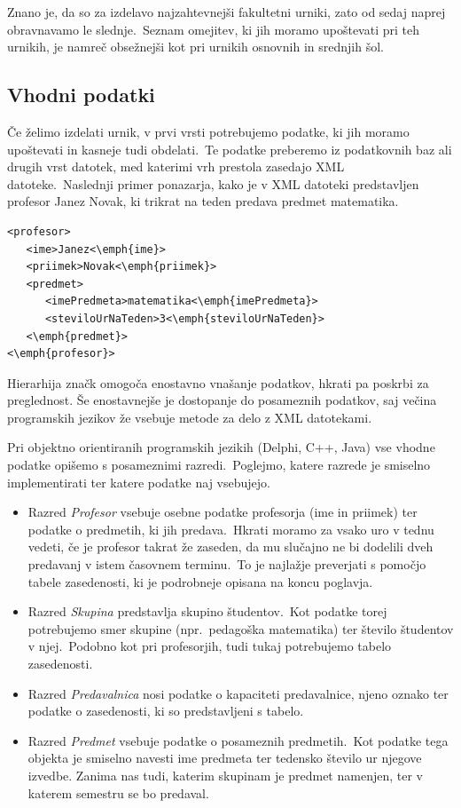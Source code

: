 \documentclass[a4paper,10pt]{article}
\begin{document}
Znano je, da so za izdelavo najzahtevnejši fakultetni urniki, zato od sedaj naprej
obravnavamo le slednje.\ Seznam omejitev, ki jih moramo upoštevati pri teh urnikih,
je namreč obsežnejši kot pri urnikih osnovnih in srednjih šol.

\subsection{Vhodni podatki}

Če želimo izdelati urnik, v prvi vrsti potrebujemo podatke, ki jih moramo upoštevati in
kasneje tudi obdelati.\ Te podatke preberemo iz podatkovnih baz ali drugih vrst datotek,
med katerimi vrh prestola zasedajo XML datoteke.\ Naslednji primer ponazarja, kako je v
XML datoteki predstavljen profesor Janez Novak, ki trikrat na teden predava predmet
matematika.

\begin{verbatim}
<profesor>
   <ime>Janez<\emph{ime}>
   <priimek>Novak<\emph{priimek}>
   <predmet>
      <imePredmeta>matematika<\emph{imePredmeta}>
      <steviloUrNaTeden>3<\emph{steviloUrNaTeden}>
   <\emph{predmet}>
<\emph{profesor}>
\end{verbatim}

\noindent Hierarhija značk omogoča enostavno vnašanje podatkov, hkrati pa poskrbi za preglednost.
Še enostavnejše je dostopanje do posameznih podatkov, saj večina programskih jezikov že
vsebuje metode za delo z XML datotekami.

Pri objektno orientiranih programskih jezikih (Delphi, C++, Java) vse vhodne podatke
opišemo s posameznimi razredi.\ Poglejmo, katere razrede je smiselno implementirati ter
katere podatke naj vsebujejo.

\begin{itemize}
   \item Razred \emph{Profesor} vsebuje osebne podatke profesorja (ime in priimek) ter
   podatke o predmetih, ki jih predava.\ Hkrati moramo za vsako uro v tednu vedeti, če
   je profesor takrat že zaseden, da mu slučajno ne bi dodelili dveh predavanj v istem
   časovnem terminu.\ To je najlažje preverjati s pomočjo tabele zasedenosti, ki je
   podrobneje opisana na koncu poglavja.

   \item Razred \emph{Skupina} predstavlja skupino študentov.\ Kot podatke torej potrebujemo
   smer skupine (npr.\ pedagoška matematika) ter število študentov v njej.\ Podobno kot pri
   profesorjih, tudi tukaj potrebujemo tabelo zasedenosti.

   \item Razred \emph{Predavalnica} nosi podatke o kapaciteti predavalnice, njeno oznako
   ter podatke o zasedenosti, ki so predstavljeni s tabelo.

   \item Razred \emph{Predmet} vsebuje podatke o posameznih predmetih.\ Kot podatke tega
   objekta je smiselno navesti ime predmeta ter tedensko število ur njegove izvedbe.
   Zanima nas tudi, katerim skupinam je predmet namenjen, ter v katerem semestru se bo
   predaval.
\end{itemize}
\end{document}
